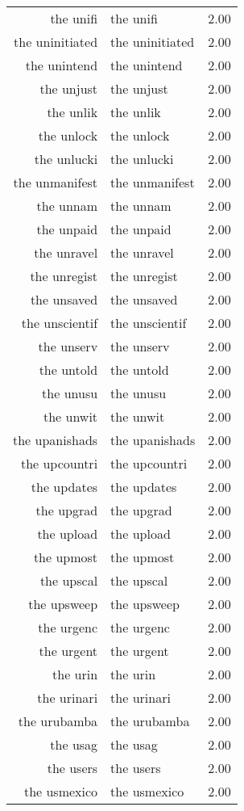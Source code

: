 \begin{table}[ht]
\begin{tabular}{rlr}
  the unifi & the unifi & 2.00 \\ 
  the uninitiated & the uninitiated & 2.00 \\ 
  the unintend & the unintend & 2.00 \\ 
  the unjust & the unjust & 2.00 \\ 
  the unlik & the unlik & 2.00 \\ 
  the unlock & the unlock & 2.00 \\ 
  the unlucki & the unlucki & 2.00 \\ 
  the unmanifest & the unmanifest & 2.00 \\ 
  the unnam & the unnam & 2.00 \\ 
  the unpaid & the unpaid & 2.00 \\ 
  the unravel & the unravel & 2.00 \\ 
  the unregist & the unregist & 2.00 \\ 
  the unsaved & the unsaved & 2.00 \\ 
  the unscientif & the unscientif & 2.00 \\ 
  the unserv & the unserv & 2.00 \\ 
  the untold & the untold & 2.00 \\ 
  the unusu & the unusu & 2.00 \\ 
  the unwit & the unwit & 2.00 \\ 
  the upanishads & the upanishads & 2.00 \\ 
  the upcountri & the upcountri & 2.00 \\ 
  the updates & the updates & 2.00 \\ 
  the upgrad & the upgrad & 2.00 \\ 
  the upload & the upload & 2.00 \\ 
  the upmost & the upmost & 2.00 \\ 
  the upscal & the upscal & 2.00 \\ 
  the upsweep & the upsweep & 2.00 \\ 
  the urgenc & the urgenc & 2.00 \\ 
  the urgent & the urgent & 2.00 \\ 
  the urin & the urin & 2.00 \\ 
  the urinari & the urinari & 2.00 \\ 
  the urubamba & the urubamba & 2.00 \\ 
  the usag & the usag & 2.00 \\ 
  the users & the users & 2.00 \\ 
  the usmexico & the usmexico & 2.00 \\ 

\end{tabular}
\end{table}
